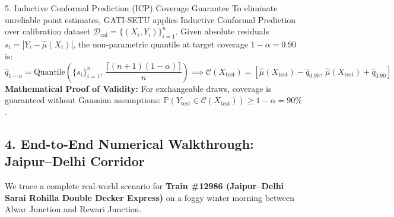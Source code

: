 \documentclass[10pt, a4paper]{article}
\begin{document}
\begin{mathbox}{5. Inductive Conformal Prediction (ICP) Coverage Guarantee}
  To eliminate unreliable point estimates, GATI-SETU applies Inductive Conformal Prediction over calibration dataset $\mathcal{D}_{\text{cal}} = \{(X_i, Y_i)\}_{i=1}^n$. Given absolute residuals $s_i = |Y_i - \hat{\mu}(X_i)|$, the non-parametric quantile at target coverage $1 - \alpha = 0.90$ is:
  \begin{equation}
    \hat{q}_{1-\alpha} = \text{Quantile}\left(\{s_i\}_{i=1}^n, \, \frac{\lceil(n + 1)(1 - \alpha)\rceil}{n}\right) \implies \mathcal{C}(X_{\text{test}}) = \left[\hat{\mu}(X_{\text{test}}) - \hat{q}_{0.90}, \, \hat{\mu}(X_{\text{test}}) + \hat{q}_{0.90}\right]
  \end{equation}
  \textbf{Mathematical Proof of Validity:} For exchangeable draws, coverage is guaranteed without Gaussian assumptions: $\mathbb{P}\left(Y_{\text{test}} \in \mathcal{C}(X_{\text{test}})\right) \ge 1 - \alpha = 90\%$.
\end{mathbox}

\subsection*{4. End-to-End Numerical Walkthrough: Jaipur--Delhi Corridor}
We trace a complete real-world scenario for \textbf{Train \#12986 (Jaipur--Delhi Sarai Rohilla Double Decker Express)} on a foggy winter morning between Alwar Junction and Rewari Junction.
\end{document}
